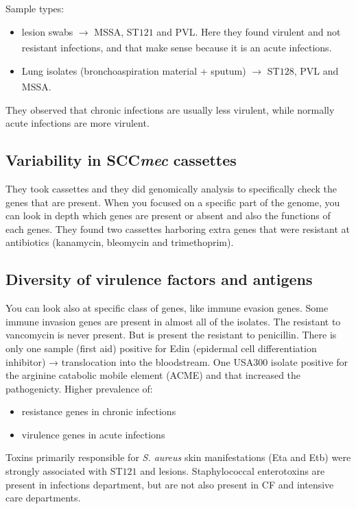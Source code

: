 Sample types: 

\begin{itemize}
    \item lesion swabs $\xrightarrow[]{}$ MSSA, ST$121$ and PVL. Here they found virulent and not resistant infections, and that make sense because it is an acute infections.
    \item Lung isolates (bronchoaspiration material + sputum) $\xrightarrow[]{}$ ST$128$, PVL and MSSA. 
\end{itemize}

They observed that chronic infections are usually less virulent, while normally acute infections are more virulent. 

\subsection{Variability in SCC\emph{mec} cassettes}

They took cassettes and they did genomically analysis to specifically check the genes that are present. When you focused on a specific part of the genome, you can look in depth which genes are present or absent and also the functions of each genes. They found two cassettes harboring extra genes that were resistant at antibiotics (kanamycin, bleomycin and trimethoprim). 

\subsection{Diversity of virulence factors and antigens}

You can look also at specific class of genes, like immune evasion genes. Some immune invasion genes are present in almost all of the isolates. The resistant to vancomycin is never present. But is present the resistant to penicillin. 
There is only one sample (first aid) positive for Edin (epidermal cell differentiation inhibitor) → translocation into the bloodstream.
One USA300 isolate positive for the arginine catabolic mobile element (ACME) and that increased the pathogenicty.
Higher prevalence of: 

\begin{itemize}
    \item resistance genes in chronic infections
    \item virulence genes in acute infections
\end{itemize}

Toxins primarily responsible for \emph{S. aureus} skin manifestations (Eta and Etb) were strongly associated with ST$121$ and lesions.
Staphylococcal enterotoxins are present in infections department, but are not also present in CF and intensive care departments. 

